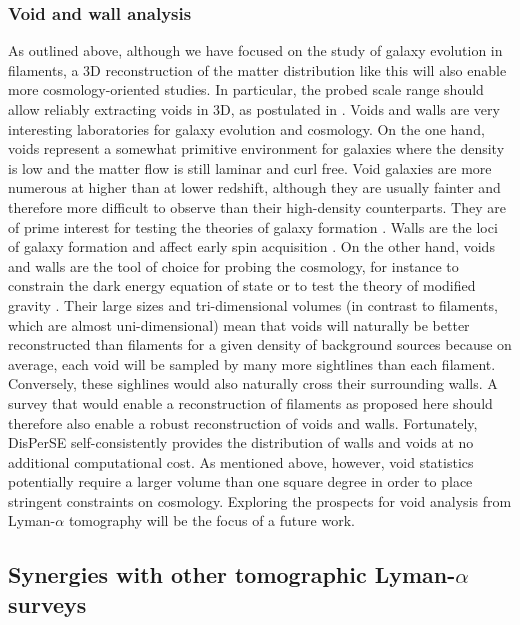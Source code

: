 \documentclass{aa}
\begin{document}
\subsubsection{Void and wall analysis}
As outlined above, although we have focused on the study of galaxy evolution in filaments, a 3D reconstruction of the matter distribution like this will also enable more cosmology-oriented studies. In particular, the probed scale range should allow reliably extracting voids in 3D, as postulated in \cite{krowleski18}. Voids and walls are very interesting laboratories for galaxy evolution and cosmology. On the one hand, voids represent a somewhat primitive environment for galaxies where the density is low and the matter flow is still laminar and curl free. Void galaxies are more numerous at higher than at lower redshift, although they are usually fainter and therefore more difficult to observe than their high-density counterparts. They are of prime interest for testing the theories of galaxy formation \citep[e.g.][]{lindner1996,hoeft06, Moorman16}. Walls are the loci of galaxy formation and affect early spin acquisition \citep{codis15}. On the other hand, voids and walls are the tool of choice for probing the cosmology, for instance to constrain the dark energy equation of state or to test the theory of modified gravity \citep[e.g.][inter alia]{Gay12,lavaux12,Cai15,hamaus16,falck18}. Their large sizes and tri-dimensional volumes (in contrast to filaments, which are almost uni-dimensional) mean that voids will naturally be better reconstructed than filaments for a given density of background sources because on average, each void will be sampled by many more sightlines than each filament. Conversely, these sighlines would also naturally cross their surrounding walls. A survey  that would enable a reconstruction of filaments as proposed here should therefore also enable a robust reconstruction of voids and walls. Fortunately, {\sc DisPerSE}  self-consistently provides the distribution of walls and voids at no additional computational cost. 
As mentioned above, however, void statistics potentially require a larger volume than one square degree in order to place stringent constraints on cosmology. Exploring the prospects for void analysis from Lyman-$\alpha$ tomography will be the focus of a future work. 


\subsection{Synergies with other tomographic Lyman-$\alpha$ surveys}
\end{document}
